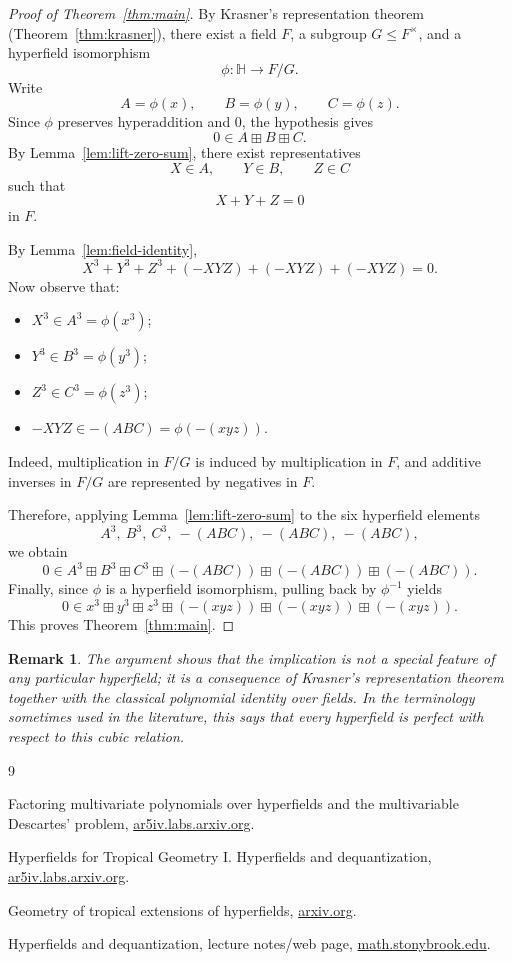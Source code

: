 \documentclass{article}
\newtheorem{remark}[theorem]{Remark}
\begin{document}
\begin{proof}[Proof of Theorem~\ref{thm:main}]
By Krasner's representation theorem (Theorem~\ref{thm:krasner}), there exist a field \(F\), a subgroup \(G\le F^\times\), and a hyperfield isomorphism
\[
\phi:\mathbb H\longrightarrow F/G.
\]
Write
\[
A=\phi(x),\qquad B=\phi(y),\qquad C=\phi(z).
\]
Since \(\phi\) preserves hyperaddition and \(0\), the hypothesis gives
\[
0\in A\boxplus B\boxplus C.
\]
By Lemma~\ref{lem:lift-zero-sum}, there exist representatives
\[
X\in A,\qquad Y\in B,\qquad Z\in C
\]
such that
\[
X+Y+Z=0
\]
in \(F\).

By Lemma~\ref{lem:field-identity},
\[
X^3+Y^3+Z^3+(-XYZ)+(-XYZ)+(-XYZ)=0.
\]
Now observe that:
\begin{itemize}
\item \(X^3\in A^3=\phi(x^3)\);
\item \(Y^3\in B^3=\phi(y^3)\);
\item \(Z^3\in C^3=\phi(z^3)\);
\item \(-XYZ\in -(ABC)=\phi(-(xyz))\).
\end{itemize}
Indeed, multiplication in \(F/G\) is induced by multiplication in \(F\), and additive inverses in \(F/G\) are represented by negatives in \(F\).

Therefore, applying Lemma~\ref{lem:lift-zero-sum} to the six hyperfield elements
\[
A^3,\ B^3,\ C^3,\ -(ABC),\ -(ABC),\ -(ABC),
\]
we obtain
\[
0\in
A^3\boxplus B^3\boxplus C^3
\boxplus (-(ABC))\boxplus (-(ABC))\boxplus (-(ABC)).
\]
Finally, since \(\phi\) is a hyperfield isomorphism, pulling back by \(\phi^{-1}\) yields
\[
0\in
x^3\boxplus y^3\boxplus z^3
\boxplus (-(xyz))\boxplus (-(xyz))\boxplus (-(xyz)).
\]
This proves Theorem~\ref{thm:main}.
\end{proof}

\begin{remark}
The argument shows that the implication is not a special feature of any particular hyperfield; it is a consequence of Krasner's representation theorem together with the classical polynomial identity over fields. In the terminology sometimes used in the literature, this says that every hyperfield is \emph{perfect} with respect to this cubic relation.
\end{remark}

\begin{thebibliography}{9}

Factoring multivariate polynomials over hyperfields and the multivariable Descartes' problem,
\href{https://ar5iv.labs.arxiv.org/html/2307.09400}{ar5iv.labs.arxiv.org}.

Hyperfields for Tropical Geometry I. Hyperfields and dequantization,
\href{https://ar5iv.labs.arxiv.org/html/1006.3034}{ar5iv.labs.arxiv.org}.

Geometry of tropical extensions of hyperfields,
\href{https://arxiv.org/html/2309.17302}{arxiv.org}.

Hyperfields and dequantization, lecture notes/web page,
\href{https://www.math.stonybrook.edu/\%7Eoleg/VersoTeX/Show/Hyperfields/hf.html}{math.stonybrook.edu}.

\end{thebibliography}
\end{document}
